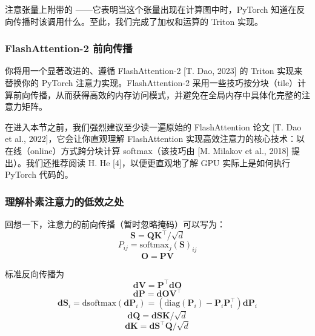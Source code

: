 注意张量上附带的 ——它表明当这个张量出现在计算图中时，PyTorch 知道在反向传播时该调用什么。至此，我们完成了加权和运算的 Triton 实现。

\subsubsection{FlashAttention-2 前向传播}

你将用一个显著改进的、遵循 FlashAttention-2 [T. Dao, 2023] 的 Triton 实现来替换你的 PyTorch 注意力实现。FlashAttention-2 采用一些技巧按分块（tile）计算前向传播，从而获得高效的内存访问模式，并避免在全局内存中具体化完整的注意力矩阵。

在进入本节之前，我们强烈建议至少读一遍原始的 FlashAttention 论文 [T. Dao et al., 2022]，它会让你直观理解 FlashAttention 实现高效注意力的核心技术：以在线（online）方式跨分块计算 softmax（该技巧由 [M. Milakov et al., 2018] 提出）。我们还推荐阅读 H. He [4]，以便更直观地了解 GPU 实际上是如何执行 PyTorch 代码的。

\subsubsection*{理解朴素注意力的低效之处}

回想一下，注意力的前向传播（暂时忽略掩码）可以写为：
\begin{equation}
\boldsymbol{S} = \boldsymbol{Q}\boldsymbol{K}^{\top} / \sqrt{d}
\end{equation}
\begin{equation}
P_{ij} = \mathrm{softmax}_j(\boldsymbol{S})_{ij}
\end{equation}
\begin{equation}
\boldsymbol{O} = \boldsymbol{P}\boldsymbol{V}
\end{equation}

标准反向传播为
\begin{equation}
\boldsymbol{dV} = \boldsymbol{P}^{\top} \boldsymbol{dO}
\end{equation}
\begin{equation}
\boldsymbol{dP} = \boldsymbol{dO}\boldsymbol{V}^{\top}
\end{equation}
\begin{equation}
\boldsymbol{dS}_i = \mathrm{dsoftmax}(\boldsymbol{dP}_i) = \left(\mathrm{diag}(\boldsymbol{P}_i) - \boldsymbol{P}_i \boldsymbol{P}_i^{\top}\right) \boldsymbol{dP}_i
\end{equation}
\begin{equation}
\boldsymbol{dQ} = \boldsymbol{dS}\boldsymbol{K} / \sqrt{d}
\end{equation}
\begin{equation}
\boldsymbol{dK} = \boldsymbol{dS}^{\top} \boldsymbol{Q} / \sqrt{d}
\end{equation}

